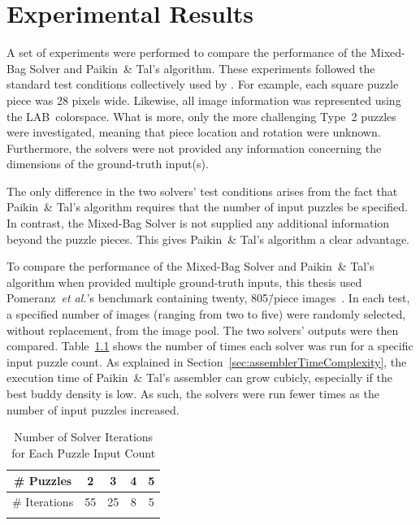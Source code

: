 \chapter{Experimental Results}\label{chap:experimentalResults}

A set of experiments were performed to compare the performance of the Mixed-Bag Solver and Paikin~\& Tal's algorithm.  These experiments followed the standard test conditions collectively used by \cite{cho2010, pomeranz2011, gallagher2012, sholomon2013, paikin2015}.  For example, each square puzzle piece was 28 pixels wide.  Likewise, all image information was represented using the LAB~colorspace.  What is more, only the more challenging Type~2 puzzles were investigated, meaning that piece location and rotation were unknown.  Furthermore, the solvers were not provided any information concerning the dimensions of the ground-truth input(s).

The only difference in the two solvers' test conditions arises from the fact that Paikin~\& Tal's algorithm requires that the number of input puzzles be specified. In contrast, the Mixed-Bag Solver is not supplied any additional information beyond the puzzle pieces.  This gives Paikin~\& Tal's algorithm a clear advantage.

To compare the performance of the Mixed-Bag Solver and Paikin~\& Tal's algorithm when provided multiple ground-truth inputs, this thesis used Pomeranz~\textit{et al.}'s benchmark containing twenty, 805\=/piece images~\cite{pomeranzBenchmarkImages}.  In each test, a specified number of images (ranging from two to five) were randomly selected, without replacement, from the image pool.  The two solvers' outputs were then compared.  Table~\ref{tab:numberSolverIterations} shows the number of times each solver was run for a specific input puzzle count. As explained in Section~\ref{sec:assemblerTimeComplexity}, the execution time of Paikin~\& Tal's assembler can grow cubicly, especially if the best buddy density is low.  As such, the solvers were run fewer times as the number of input puzzles increased.

\begin{table}[tb]
  \begin{center}
    \caption{Number of Solver Iterations for Each Puzzle Input Count}\label{tab:numberSolverIterations}
    \begin{tabular}{ |c||c|c|c|c| } 
      \Xhline{1pt}
       \# Puzzles    &  2 &  3 & 4 & 5 \\ 
      \hline \hline
       \# Iterations & 55 & 25 & 8 & 5 \\ 
       \Xhline{1pt}
    \end{tabular}
  \end{center}
\end{table}

